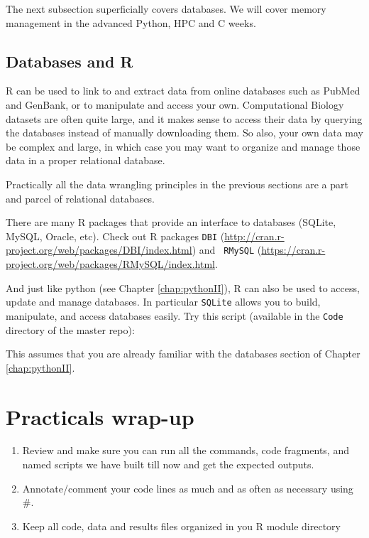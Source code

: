 The next subsection superficially covers databases. We will cover 
memory management in the advanced Python, HPC and C weeks.

\subsection{Databases and R}

R can be used to link to and extract data from online databases such as PubMed 
and GenBank, or to manipulate and access your own. 
Computational Biology datasets are often quite 
large, and it makes sense to access their data by querying the 
databases instead of manually downloading them. So also, your own data 
may be complex and large, in which case you may want to organize and 
manage those data in a proper relational database. 

Practically all the data wrangling principles in the previous sections 
are a part and parcel of relational databases. 

There are many R packages 
that provide an interface to databases (SQLite, MySQL, Oracle, etc). 
Check out R packages {\tt DBI} 
(\url{http://cran.r-project.org/web/packages/DBI/index.html}) and {\tt 
RMySQL} 
(\url{https://cran.r-project.org/web/packages/RMySQL/index.html}.

And just like python (see Chapter \ref{chap:pythonII}), R can also be used 
to access, update and manage databases. In particular {\tt SQLite} 
allows you to build, manipulate, and access databases easily. Try this script 
(available in the {\tt Code} directory of the master repo):
 
This assumes that you are already familiar with the databases section 
of Chapter \ref{chap:pythonII}. 

\section{Practicals wrap-up}

  \begin{enumerate}

	\item Review and make sure you can run all the commands, code 
	fragments, and named scripts we have built till now and get the 
	expected outputs.

	\item Annotate/comment your code lines as much and as often as necessary 
	using \#.
	
	\item Keep all code, data and results files organized in you R 
	module directory
	 
   \end{enumerate}

